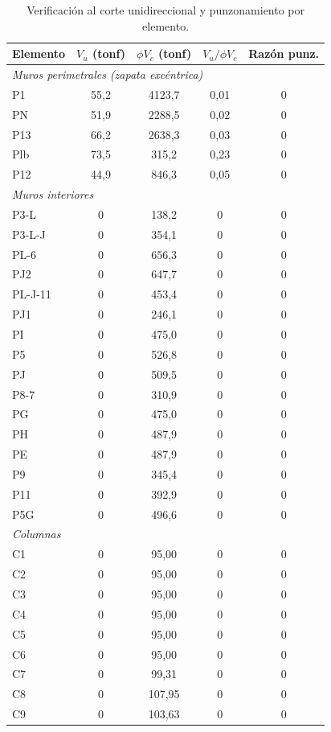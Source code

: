 \begin{table}[H]
\centering
\footnotesize
\setlength{\tabcolsep}{5pt}
\caption{Verificación al corte unidireccional y punzonamiento por elemento.}
\label{tab:corte}
\begin{tabular}{lcccc}
\hline
Elemento & $V_u$ (tonf) & $\phi V_c$ (tonf) & $V_u/\phi V_c$ & Razón punz. \\
\hline
\multicolumn{5}{l}{\textit{Muros perimetrales (zapata excéntrica)}} \\
\hline
P1  & 55,2 & 4123,7 & 0,01 & 0 \\
PN  & 51,9 & 2288,5 & 0,02 & 0 \\
P13 & 66,2 & 2638,3 & 0,03 & 0 \\
Plb & 73,5 & 315,2  & 0,23 & 0 \\
P12 & 44,9 & 846,3  & 0,05 & 0 \\
\hline
\multicolumn{5}{l}{\textit{Muros interiores}} \\
\hline
P3-L    & 0 & 138,2 & 0 & 0 \\
P3-L-J  & 0 & 354,1 & 0 & 0 \\
PL-6    & 0 & 656,3 & 0 & 0 \\
PJ2     & 0 & 647,7 & 0 & 0 \\
PL-J-11 & 0 & 453,4 & 0 & 0 \\
PJ1     & 0 & 246,1 & 0 & 0 \\
PI      & 0 & 475,0 & 0 & 0 \\
P5      & 0 & 526,8 & 0 & 0 \\
PJ      & 0 & 509,5 & 0 & 0 \\
P8-7    & 0 & 310,9 & 0 & 0 \\
PG      & 0 & 475,0 & 0 & 0 \\
PH      & 0 & 487,9 & 0 & 0 \\
PE      & 0 & 487,9 & 0 & 0 \\
P9      & 0 & 345,4 & 0 & 0 \\
P11     & 0 & 392,9 & 0 & 0 \\
P5G     & 0 & 496,6 & 0 & 0 \\
\hline
\multicolumn{5}{l}{\textit{Columnas}} \\
\hline
C1 & 0 & 95,00  & 0 & 0 \\
C2 & 0 & 95,00  & 0 & 0 \\
C3 & 0 & 95,00  & 0 & 0 \\
C4 & 0 & 95,00  & 0 & 0 \\
C5 & 0 & 95,00  & 0 & 0 \\
C6 & 0 & 95,00  & 0 & 0 \\
C7 & 0 & 99,31  & 0 & 0 \\
C8 & 0 & 107,95 & 0 & 0 \\
C9 & 0 & 103,63 & 0 & 0 \\
\hline
\end{tabular}
\end{table}

